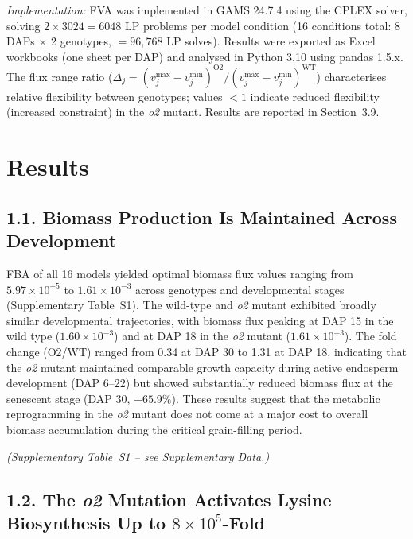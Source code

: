 \documentclass[12pt,a4paper]{article}
\begin{document}
\noindent\textit{Implementation:} FVA was implemented in GAMS 24.7.4 using the CPLEX solver, solving $2 \times 3024 = 6048$ LP problems per model condition (16 conditions total: 8 DAPs $\times$ 2 genotypes, $= 96,768$ LP solves). Results were exported as Excel workbooks (one sheet per DAP) and analysed in Python 3.10 using pandas 1.5.x. The flux range ratio ($\Delta_j = (v_j^{\max} - v_j^{\min})^{\mathrm{O2}} / (v_j^{\max} - v_j^{\min})^{\mathrm{WT}}$) characterises relative flexibility between genotypes; values $< 1$ indicate reduced flexibility (increased constraint) in the \textit{o2} mutant. Results are reported in Section~3.9.

\section{Results}

\subsection{1.1. Biomass Production Is Maintained Across Development}

FBA of all 16 models yielded optimal biomass flux values ranging from $5.97 \times 10^{-5}$ to $1.61 \times 10^{-3}$ across genotypes and developmental stages (Supplementary Table~S1). The wild-type and \textit{o2} mutant exhibited broadly similar developmental trajectories, with biomass flux peaking at DAP 15 in the wild type ($1.60 \times 10^{-3}$) and at DAP 18 in the \textit{o2} mutant ($1.61 \times 10^{-3}$). The fold change (O2/WT) ranged from 0.34 at DAP 30 to 1.31 at DAP 18, indicating that the \textit{o2} mutant maintained comparable growth capacity during active endosperm development (DAP 6--22) but showed substantially reduced biomass flux at the senescent stage (DAP 30, $-65.9\%$). These results suggest that the metabolic reprogramming in the \textit{o2} mutant does not come at a major cost to overall biomass accumulation during the critical grain-filling period.


\noindent\textit{(Supplementary Table~S1 -- see Supplementary Data.)}


\subsection{1.2. The \textit{o2} Mutation Activates Lysine Biosynthesis Up to $8 \times 10^{5}$-Fold}
\end{document}
